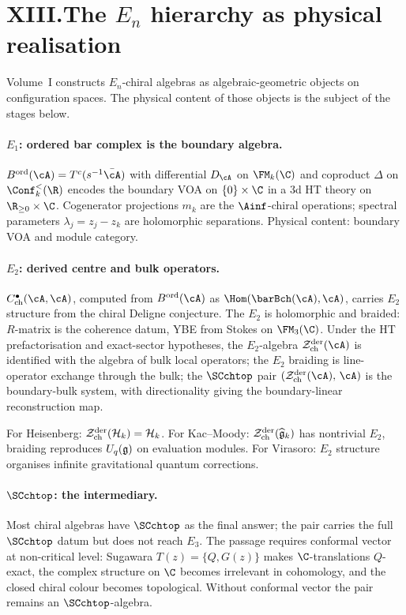 \section*{XIII.\quad The $E_n$ hierarchy as physical realisation}

\noindent
Volume~I constructs $E_n$-chiral algebras as algebraic-geometric
objects on configuration spaces. The physical content of those
objects is the subject of the stages below.

\paragraph{$E_1$: ordered bar complex is the boundary algebra.}
$B^{\mathrm{ord}}(\cA) = T^c(s^{-1}\bar\cA)$ with differential
$D_\cA$ on $\FM_k(\C)$ and coproduct $\Delta$ on $\Conf_k^<(\R)$
encodes the boundary VOA on $\{0\} \times \C$ in a 3d HT theory
on $\R_{\ge 0} \times \C$. Cogenerator projections $m_k$ are the
$\Ainf$-chiral operations; spectral parameters
$\lambda_j = z_j - z_k$ are holomorphic separations. Physical
content: boundary VOA and module category.

\paragraph{$E_2$: derived centre and bulk operators.}
$C^\bullet_{\mathrm{ch}}(\cA,\cA)$, computed from
$B^{\mathrm{ord}}(\cA)$ as
$\Hom(\barBch(\cA), \cA)$, carries $E_2$ structure from the
chiral Deligne conjecture. The $E_2$ is holomorphic and braided:
$R$-matrix is the coherence datum, YBE from Stokes on
$\FM_3(\C)$. Under the HT prefactorisation and exact-sector
hypotheses, the $E_2$-algebra
$\cZ^{\mathrm{der}}_{\mathrm{ch}}(\cA)$ is identified with the
algebra of bulk local operators; the $E_2$ braiding is
line-operator exchange through the bulk; the $\SCchtop$ pair
$(\cZ^{\mathrm{der}}_{\mathrm{ch}}(\cA),\,\cA)$ is the
boundary-bulk system, with directionality giving the
boundary-linear reconstruction map.

For Heisenberg: $\mathcal{Z}^{\mathrm{der}}_{\mathrm{ch}}(\mathcal{H}_k) = \mathcal{H}_k$.
For Kac--Moody:
$\mathcal{Z}^{\mathrm{der}}_{\mathrm{ch}}(\widehat{\mathfrak{g}}_k)$ has nontrivial
$E_2$, braiding reproduces $U_q(\mathfrak{g})$ on evaluation modules. For
Virasoro: $E_2$ structure organises infinite gravitational
quantum corrections.

\paragraph{$\SCchtop$: the intermediary.}
Most chiral algebras have $\SCchtop$ as the final answer; the
pair carries the full $\SCchtop$ datum but does not reach $E_3$.
The passage requires conformal vector at non-critical level:
Sugawara $T(z) = \{Q,G(z)\}$ makes $\C$-translations $Q$-exact,
the complex structure on $\C$ becomes irrelevant in cohomology,
and the closed chiral colour becomes topological. Without
conformal vector the pair remains an $\SCchtop$-algebra.

